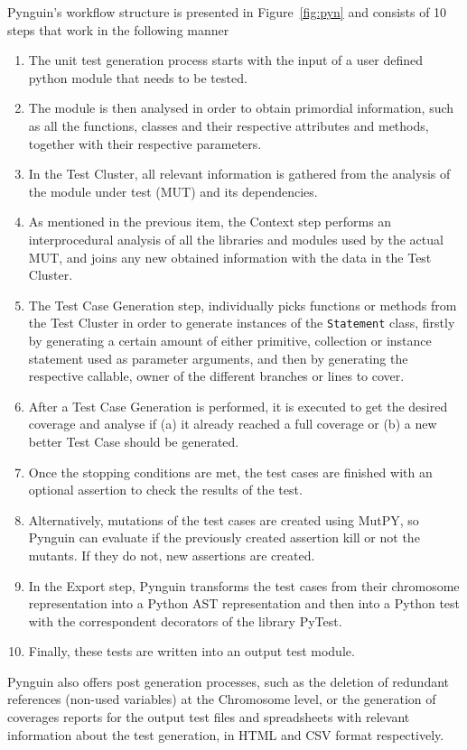 \documentclass[%
  chapterprefix=false,%
  open=right,%
  twoside=true,%
  paper=a4,%
  logofile={Figures/logo.png},%
  thesistype=master,%
  UKenglish,%
]{se2thesis}
\newcommand{\classname}[1]{\texttt{#1}}
\begin{document}
Pynguin's workflow structure is presented in Figure~\ref{fig:pyn} and consists of 10 steps that work in the following manner
\begin{enumerate}
  \item The unit test generation process starts with the input of a user defined python module that needs to be tested.
  \item The module is then analysed in order to obtain primordial information, such as all the functions, classes and their respective attributes and methods, together with their respective parameters.
  \item In the Test Cluster, all relevant information is gathered from the analysis of the module under test (MUT) and its dependencies.
  \item As mentioned in the previous item, the Context step performs an interprocedural analysis of all the libraries and modules used by the actual MUT, and joins any new obtained information with the data in the Test Cluster.
  \item The Test Case Generation step, individually picks functions or methods from the Test Cluster in order to generate instances of the \classname{Statement} class, firstly by generating a certain amount of either primitive, collection or instance statement used as parameter arguments, and then by generating the respective callable, owner of the different branches or lines to cover.
  \item After a Test Case Generation is performed, it is executed to get the desired coverage and analyse if (a) it already reached a full coverage or (b) a new better Test Case should be generated.
  \item Once the stopping conditions are met, the test cases are finished with an optional assertion to check the results of the test.
  \item Alternatively, mutations of the test cases are created using MutPY, so Pynguin can evaluate if the previously created assertion kill or not the mutants.
  If they do not, new assertions are created.
  \item In the Export step, Pynguin transforms the test cases from their chromosome representation into a Python AST representation and then into a Python test with the correspondent decorators of the library PyTest.
  \item Finally, these tests are written into an output test module.
\end{enumerate}

Pynguin also offers post generation processes, such as the deletion of redundant references (non-used variables) at the Chromosome level, or the generation of coverages reports  for the output test files and spreadsheets with relevant information about the test generation, in HTML and CSV format respectively.
\end{document}

